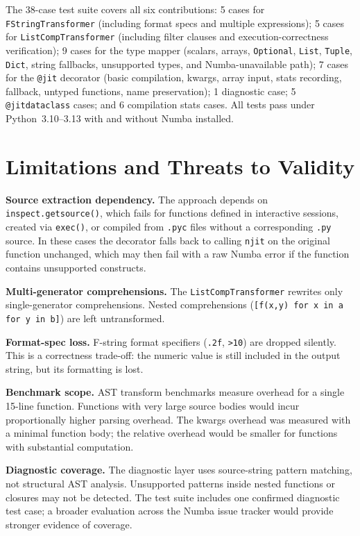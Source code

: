 \documentclass[journal]{IEEEtran}
\begin{document}
The 38-case test suite covers all six contributions: 5 cases for
\texttt{FStringTransformer} (including format specs and multiple expressions);
5 cases for \texttt{ListCompTransformer} (including filter clauses and
execution-correctness verification); 9 cases for the type mapper (scalars,
arrays, \texttt{Optional}, \texttt{List}, \texttt{Tuple}, \texttt{Dict},
string fallbacks, unsupported types, and Numba-unavailable path); 7 cases for
the \texttt{@jit} decorator (basic compilation, kwargs, array input, stats
recording, fallback, untyped functions, name preservation); 1 diagnostic
case; 5 \texttt{@jitdataclass} cases; and 6 compilation stats cases. All
tests pass under Python~3.10–3.13 with and without Numba installed.

\section{Limitations and Threats to Validity}
\label{sec:threats}

\textbf{Source extraction dependency.} The approach depends on
\texttt{inspect.getsource()}, which fails for functions defined in interactive
sessions, created via \texttt{exec()}, or compiled from \texttt{.pyc} files
without a corresponding \texttt{.py} source. In these cases the decorator
falls back to calling \texttt{njit} on the original function unchanged, which
may then fail with a raw Numba error if the function contains unsupported
constructs.

\textbf{Multi-generator comprehensions.} The \texttt{ListCompTransformer}
rewrites only single-generator comprehensions. Nested comprehensions
(\texttt{[f(x,y) for x in a for y in b]}) are left untransformed.

\textbf{Format-spec loss.} F-string format specifiers (\texttt{.2f},
\texttt{>10}) are dropped silently. This is a correctness trade-off: the
numeric value is still included in the output string, but its formatting
is lost.

\textbf{Benchmark scope.} AST transform benchmarks measure overhead for a
single 15-line function. Functions with very large source bodies would
incur proportionally higher parsing overhead. The kwargs overhead was measured
with a minimal function body; the relative overhead would be smaller for
functions with substantial computation.

\textbf{Diagnostic coverage.} The diagnostic layer uses source-string
pattern matching, not structural AST analysis. Unsupported patterns inside
nested functions or closures may not be detected. The test suite includes one
confirmed diagnostic test case; a broader evaluation across the Numba issue
tracker would provide stronger evidence of coverage.
\end{document}
